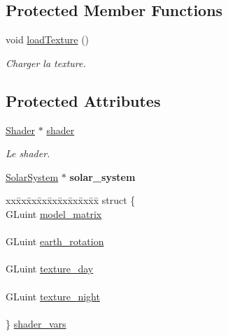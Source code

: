 \subsection*{Protected Member Functions}
\begin{DoxyCompactItemize}
\item 
void \mbox{\hyperlink{classEarth_a6ea4717d6f25f585959f8c2a27b310b5}{load\+Texture}} ()
\begin{DoxyCompactList}\small\item\em Charger la texture. \end{DoxyCompactList}\end{DoxyCompactItemize}
\subsection*{Protected Attributes}
\begin{DoxyCompactItemize}
\item 
\mbox{\label{classEarth_a70cd76e7ae13e01da5b336476f594804}} 
\mbox{\hyperlink{classShader}{Shader}} $\ast$ \mbox{\hyperlink{classEarth_a70cd76e7ae13e01da5b336476f594804}{shader}}
\begin{DoxyCompactList}\small\item\em Le shader. \end{DoxyCompactList}\item 
\mbox{\label{classEarth_a95dbde38ff24a32afa2020532b96d04b}} 
\mbox{\hyperlink{classSolarSystem}{Solar\+System}} $\ast$ {\bfseries solar\+\_\+system}
\item 
\mbox{\label{classEarth_ac030d9262aa545b8c4cb6efea8474321}} 
\begin{tabbing}
xx\=xx\=xx\=xx\=xx\=xx\=xx\=xx\=xx\=\kill
struct \{\\
\>GLuint \mbox{\hyperlink{classEarth_a23f243526b68042e166ece9c6fd2ac27}{model\_matrix}}\\
\>\\
\>GLuint \mbox{\hyperlink{classEarth_a2837b51a68cae97630bf43c89a932fe6}{earth\_rotation}}\\
\>\\
\>GLuint \mbox{\hyperlink{classEarth_a13d70083ad4c9322eb28503927622ba4}{texture\_day}}\\
\>\\
\>GLuint \mbox{\hyperlink{classEarth_ad83d9351423dc37314ca3e7193964142}{texture\_night}}\\
\>\\
\} \mbox{\hyperlink{classEarth_ac030d9262aa545b8c4cb6efea8474321}{shader\_vars}}\\


\end{tabbing}
\end{DoxyCompactItemize}
